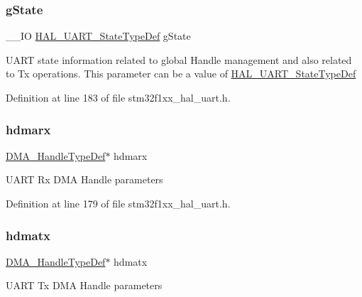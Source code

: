 \subsubsection{\texorpdfstring{g\+State}{gState}}
{\footnotesize\ttfamily \+\_\+\+\_\+\+IO \hyperlink{group___u_a_r_t___exported___types_gaf55d844a35379c204c90be5d1e8e50ba}{H\+A\+L\+\_\+\+U\+A\+R\+T\+\_\+\+State\+Type\+Def} g\+State}

U\+A\+RT state information related to global Handle management and also related to Tx operations. This parameter can be a value of \hyperlink{group___u_a_r_t___exported___types_gaf55d844a35379c204c90be5d1e8e50ba}{H\+A\+L\+\_\+\+U\+A\+R\+T\+\_\+\+State\+Type\+Def} 

Definition at line 183 of file stm32f1xx\+\_\+hal\+\_\+uart.\+h.

\mbox{\label{struct_u_a_r_t___handle_type_def_abd0aeec20298a55d89a440320e35634f}} 
\subsubsection{\texorpdfstring{hdmarx}{hdmarx}}
{\footnotesize\ttfamily \hyperlink{group___d_m_a___exported___types_ga92b907d56a9c29b93d46782a7a04f91e}{D\+M\+A\+\_\+\+Handle\+Type\+Def}$\ast$ hdmarx}

U\+A\+RT Rx D\+MA Handle parameters 

Definition at line 179 of file stm32f1xx\+\_\+hal\+\_\+uart.\+h.

\mbox{\label{struct_u_a_r_t___handle_type_def_a33e13c28b1a70e6164417abb026d7a22}} 
\subsubsection{\texorpdfstring{hdmatx}{hdmatx}}
{\footnotesize\ttfamily \hyperlink{group___d_m_a___exported___types_ga92b907d56a9c29b93d46782a7a04f91e}{D\+M\+A\+\_\+\+Handle\+Type\+Def}$\ast$ hdmatx}

U\+A\+RT Tx D\+MA Handle parameters 

